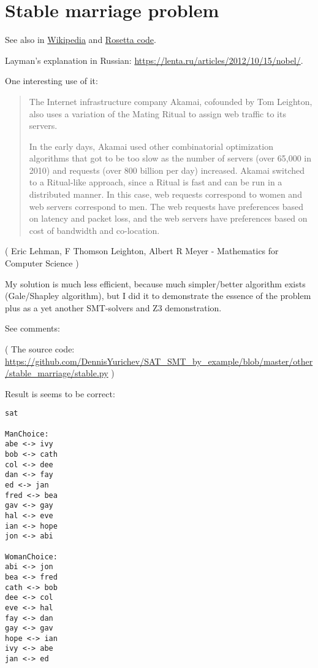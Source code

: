 \section{Stable marriage problem}

\renewcommand{\CURPATH}{other/stable_marriage}

See also in
\href{https://en.wikipedia.org/wiki/Stable_marriage_problem}{Wikipedia} and 
\href{https://rosettacode.org/wiki/Stable_marriage_problem}{Rosetta code}.

Layman's explanation in Russian: \url{https://lenta.ru/articles/2012/10/15/nobel/}.

One interesting use of it:

\begin{framed}
\begin{quotation}
The Internet infrastructure company Akamai, cofounded by Tom Leighton, also uses a variation of the Mating Ritual to assign web traffic to its servers.

In the early days, Akamai used other combinatorial optimization algorithms that got to be too slow as the number of servers (over 65,000 in 2010) and requests (over 800 billion per day) increased. Akamai switched to a Ritual-like approach, since a Ritual is fast and can be run in a distributed manner. In this case, web requests correspond to women and web servers correspond to men. The web requests have preferences based on latency and packet loss, and the web servers have preferences based on cost of bandwidth and co-location.
\end{quotation}
\end{framed}
( Eric Lehman, F Thomson Leighton, Albert R Meyer - Mathematics for Computer Science ) 

My solution is much less efficient, because much simpler/better algorithm exists (Gale/Shapley algorithm),
but I did it to demonstrate the essence of the problem plus as a yet another SMT-solvers and Z3 demonstration.

See comments:



( The source code: \url{https://github.com/DennisYurichev/SAT_SMT_by_example/blob/master/other/stable_marriage/stable.py} )

Result is seems to be correct:

\begin{lstlisting}
sat

ManChoice:
abe <-> ivy
bob <-> cath
col <-> dee
dan <-> fay
ed <-> jan
fred <-> bea
gav <-> gay
hal <-> eve
ian <-> hope
jon <-> abi

WomanChoice:
abi <-> jon
bea <-> fred
cath <-> bob
dee <-> col
eve <-> hal
fay <-> dan
gay <-> gav
hope <-> ian
ivy <-> abe
jan <-> ed
\end{lstlisting}

